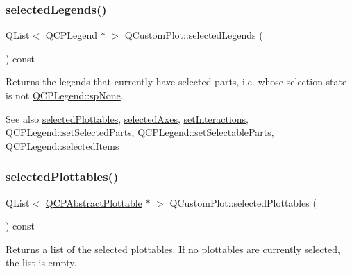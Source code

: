 \subsubsection{\texorpdfstring{selected\+Legends()}{selectedLegends()}}
{\footnotesize\ttfamily Q\+List$<$ \mbox{\hyperlink{class_q_c_p_legend}{Q\+C\+P\+Legend}} $\ast$ $>$ Q\+Custom\+Plot\+::selected\+Legends (\begin{DoxyParamCaption}{ }\end{DoxyParamCaption}) const}

Returns the legends that currently have selected parts, i.\+e. whose selection state is not \mbox{\hyperlink{class_q_c_p_legend_a5404de8bc1e4a994ca4ae69e2c7072f1a378201c07d500af7126e3ec91652eed7}{Q\+C\+P\+Legend\+::sp\+None}}.

\begin{DoxySeeAlso}{See also}
\mbox{\hyperlink{class_q_custom_plot_a747faaab57c56891e901a1e97fa4359a}{selected\+Plottables}}, \mbox{\hyperlink{class_q_custom_plot_a7e6b07792b1cb2c31681596582d14dbe}{selected\+Axes}}, \mbox{\hyperlink{class_q_custom_plot_a5ee1e2f6ae27419deca53e75907c27e5}{set\+Interactions}}, \mbox{\hyperlink{class_q_c_p_legend_a2aee309bb5c2a794b1987f3fc97f8ad8}{Q\+C\+P\+Legend\+::set\+Selected\+Parts}}, \mbox{\hyperlink{class_q_c_p_legend_a9ce60aa8bbd89f62ae4fa83ac6c60110}{Q\+C\+P\+Legend\+::set\+Selectable\+Parts}}, \mbox{\hyperlink{class_q_c_p_legend_ac7d9e567d5c551e09cd9bcc4306c5532}{Q\+C\+P\+Legend\+::selected\+Items}} 
\end{DoxySeeAlso}
\mbox{\label{class_q_custom_plot_a747faaab57c56891e901a1e97fa4359a}} 
\subsubsection{\texorpdfstring{selected\+Plottables()}{selectedPlottables()}}
{\footnotesize\ttfamily Q\+List$<$ \mbox{\hyperlink{class_q_c_p_abstract_plottable}{Q\+C\+P\+Abstract\+Plottable}} $\ast$ $>$ Q\+Custom\+Plot\+::selected\+Plottables (\begin{DoxyParamCaption}{ }\end{DoxyParamCaption}) const}

Returns a list of the selected plottables. If no plottables are currently selected, the list is empty.


